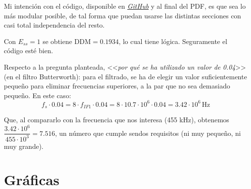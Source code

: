 Mi intención con el código, disponible en \textcolor{blue}{\textit{\href{https://github.com/IvanMoyaO/Practica-CR}{GitHub}}} y al final del PDF, es que sea lo más modular posible, de tal forma que puedan usarse las distintas secciones con casi total independencia del resto.

Con $E_{ss} = 1$ se obtiene $\text{DDM} = 0.1934$, lo cual tiene lógica. Seguramente el código esté bien.

Respecto a la pregunta planteada, <<\textit{por qué se ha utilizado un valor de 0.04}>> (en el filtro Butterworth): para el filtrado, se ha de elegir un valor suficientemente pequeño para eliminar frecuencias superiores, a la par que no sea demasiado pequeño. En este caso:
\begin{equation}
    f_s \cdot 0.04 = 8 \cdot f_{IF1} \cdot 0.04 = 8 \cdot 10.7 \cdot 10^6 \cdot 0.04 = 3.42 \cdot 10^6 \, \text{Hz}
\end{equation}

Que, al compararlo con la frecuencia que nos interesa (455 kHz), obtenemos $\dfrac{3.42 \cdot 10^6}{455 \cdot 10^3} = 7.516$, un número que cumple sendos requisitos (ni muy pequeño, ni muy grande).

\section*{Gráficas}

